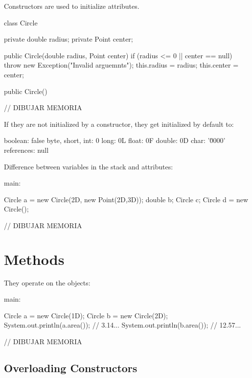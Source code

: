 \documentclass[a4paper, 9pt]{extarticle}
\begin{document}
Constructors are used to initialize attributes.

\begin{blackboard}
class Circle {
  private double radius;
  private Point center;

  public Circle(double radius, Point center) {
    if (radius <= 0 || center == null) {
      throw new Exception("Invalid arguemnts");
    }
    this.radius = radius;
    this.center = center;
  }

  public Circle() {
  }
}
                    // DIBUJAR MEMORIA
\end{blackboard}

If they are not initialized by a constructor, they get initialized by default
to:

\begin{blackboard}
boolean: false
byte, short, int: 0
long: 0L
float: 0F
double: 0D
char: '\u0000'
references: null
\end{blackboard}

Difference between variables in the stack and attributes:

\begin{blackboard}
main:

  Circle a = new Circle(2D, new Point(2D,3D));
  double b;
  Circle c;
  Circle d = new Circle();

  // DIBUJAR MEMORIA
\end{blackboard}









\section{Methods}

They operate on the objects:

\begin{blackboard}
main:

 Circle a = new Circle(1D);
 Circle b = new Circle(2D);
 System.out.println(a.area()); // 3.14...
 System.out.println(b.area()); // 12.57...

     // DIBUJAR MEMORIA
\end{blackboard}











\subsection{Overloading Constructors}
\end{document}
